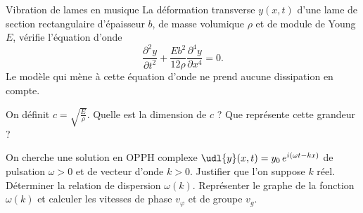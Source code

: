 \begin{exo}[PC][3][exp]{Vibration de lames en musique}
  La déformation transverse $y(x,t)$ d'une lame de section rectangulaire d’épaisseur $b$, de masse volumique $\rho$ et de module de Young $E$, vérifie l’équation d’onde
    $$
    \frac{\partial^2 y}{\partial t^2}+ \frac{E b^2}{12 \rho} \frac{\partial^4 y}{\partial x^4}=0.
    $$
    Le modèle qui mène à cette équation d’onde ne prend aucune dissipation en compte.
  \begin{quest}
    \item	On définit $c = \sqrt{\frac{E}{\rho}}$. Quelle est la dimension de $c$ ? Que représente cette grandeur ?
    
    \item  On cherche une solution en OPPH complexe $\udl{y}(x,t) = y_0 \, e^{i(\omega t -k x)}$ de pulsation $\omega>0$ et de vecteur d’onde $k>0$. Justifier que l’on suppose $k$ réel. Déterminer la relation de dispersion $\omega(k)$. Représenter le graphe de la fonction $\omega(k)$ et calculer les vitesses de phase $v_\varphi$ et de groupe $v_g$. 
    

\end{quest}
\end{exo}
